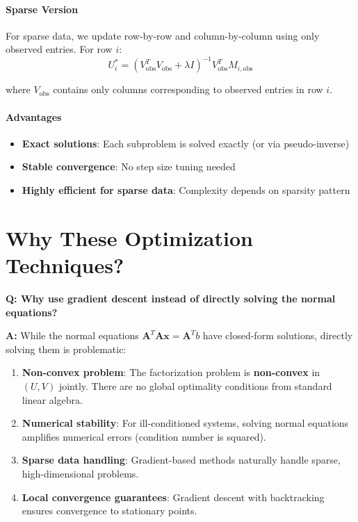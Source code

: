 \documentclass[11pt,oneside]{article}
\newcommand{\defn}[1]{\textbf{#1}}
\newcommand{\question}[1]{\textbf{Q: #1}}
\newcommand{\answer}{\textbf{A: }}
\begin{document}
\paragraph{Sparse Version}

For sparse data, we update row-by-row and column-by-column using only observed entries. For row $i$:
\begin{equation}
    U_i^* = (V_{\text{obs}}^T V_{\text{obs}} + \lambda I)^{-1} V_{\text{obs}}^T M_{i,\text{obs}}
\end{equation}

where $V_{\text{obs}}$ contains only columns corresponding to observed entries in row $i$.

\paragraph{Advantages}

\begin{itemize}
    \item \textbf{Exact solutions}: Each subproblem is solved exactly (or via pseudo-inverse)
    \item \textbf{Stable convergence}: No step size tuning needed
    \item \textbf{Highly efficient for sparse data}: Complexity depends on sparsity pattern
\end{itemize}

\section{Why These Optimization Techniques?}\label{sec:why}

\question{Why use gradient descent instead of directly solving the normal equations?}

\answer While the normal equations $\mathbf{A}^T\mathbf{A}\mathbf{x} = \mathbf{A}^Tb$ have closed-form solutions, directly solving them is problematic:

\begin{enumerate}
    \item \textbf{Non-convex problem}: The factorization problem is \defn{non-convex} in $(U, V)$ jointly. There are no global optimality conditions from standard linear algebra.
    \item \textbf{Numerical stability}: For ill-conditioned systems, solving normal equations amplifies numerical errors (condition number is squared).
    \item \textbf{Sparse data handling}: Gradient-based methods naturally handle sparse, high-dimensional problems.
    \item \textbf{Local convergence guarantees}: Gradient descent with backtracking ensures convergence to stationary points.
\end{enumerate}
\end{document}
